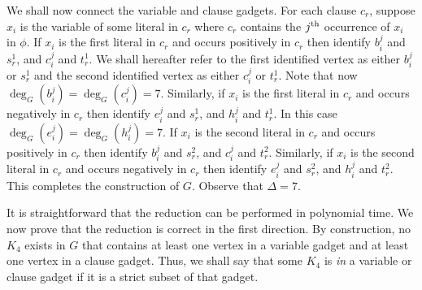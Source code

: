 We shall now connect the variable and clause gadgets. For each clause $c_r$, suppose $x_i$ is the variable of some literal in $c_r$ where $c_r$ contains the $j\textsuperscript{th}$ occurrence of $x_i$ in $\phi$. If $x_i$ is the first literal in $c_r$ and occurs positively in $c_r$ then identify $b_i^j$ and $s_r^1$, and $c_i^j$ and $t_r^1$. We shall hereafter refer to the first identified vertex as either $b_i^j$ or $s_r^1$ and the second identified vertex as either $c_i^j$ or $t_r^1$. Note that now $\deg_{G}(b_i^j) = \deg_{G}(c_i^j) = 7$. Similarly, if $x_i$ is the first literal in $c_r$ and occurs negatively in $c_r$ then identify $e_i^j$ and $s_r^1$, and $h_i^j$ and $t_r^1$. In this case $\deg_{G}(e_i^j) = \deg_{G}(h_i^j) = 7$. If $x_i$ is the second literal in $c_r$ and occurs positively in $c_r$ then identify $b_i^j$ and $s_r^2$, and $c_i^j$ and $t_r^2$. Similarly, if $x_i$ is the second literal in $c_r$ and occurs negatively in $c_r$ then identify $e_i^j$ and $s_r^2$, and $h_i^j$ and $t_r^2$. This completes the construction of $G$. Observe that $\Delta = 7$.

It is straightforward that the reduction can be performed in polynomial time. We now prove that the reduction is correct in the first direction. By construction, no $K_4$ exists in $G$ that contains at least one vertex in a variable gadget and at least one vertex in a clause gadget. Thus, we shall say that some $K_4$ is \emph{in} a variable or clause gadget if it is a strict subset of that gadget.

